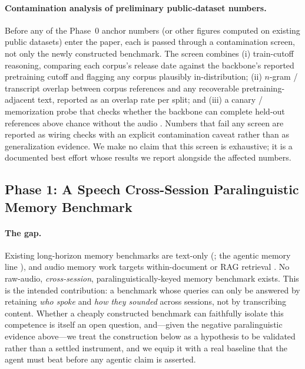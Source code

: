 \paragraph{Contamination analysis of preliminary public-dataset numbers.} Before any of the Phase~0 anchor numbers (or other figures computed on existing public datasets) enter the paper, each is passed through a contamination screen, not only the newly constructed benchmark. The screen combines (i) train-cutoff reasoning, comparing each corpus's release date against the backbone's reported pretraining cutoff and flagging any corpus plausibly in-distribution; (ii) $n$-gram / transcript overlap between corpus references and any recoverable pretraining-adjacent text, reported as an overlap rate per split; and (iii) a canary / memorization probe that checks whether the backbone can complete held-out references above chance without the audio \citep{contaminationsurvey2024,taskcontamination2024}. Numbers that fail any screen are reported as wiring checks with an explicit contamination caveat rather than as generalization evidence. We make no claim that this screen is exhaustive; it is a documented best effort whose results we report alongside the affected numbers.

\subsection{Phase 1: A Speech Cross-Session Paralinguistic Memory Benchmark}
\label{sub:phase1}

\paragraph{The gap.} Existing long-horizon memory benchmarks are text-only (\citealp{longmemeval2024,locomo2024}; the agentic memory line \citealp{amber2026,anatomymem2026}), and audio memory work targets within-document or RAG retrieval \citep{wavrag2025,voxrag2025,audiomc2025}. No raw-audio, \emph{cross-session}, paralinguistically-keyed memory benchmark exists. This is the intended contribution: a benchmark whose queries can only be answered by retaining \emph{who spoke} and \emph{how they sounded} across sessions, not by transcribing content. Whether a cheaply constructed benchmark can faithfully isolate this competence is itself an open question, and---given the negative paralinguistic evidence above---we treat the construction below as a hypothesis to be validated rather than a settled instrument, and we equip it with a real baseline that the agent must beat before any agentic claim is asserted.

